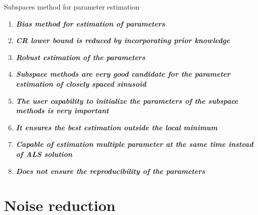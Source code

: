 \documentclass[t,12pt,english
\ifx\beamermode\undefined\else,\beamermode\fi
]{beamer}
\begin{document}
\begin{frame}{Subspaces method for parameter estimation}
 

\begin{block}{\footnotesize{}}\tiny{}
\begin{enumerate} 
\vspace{0.05cm}
      
     \item \tiny{\textbf{\textit{Bias method for estimation of parameters}}} 
     \item \tiny{\textbf{\textit{CR lower bound is reduced by incorporating prior knowledge}}} 
     \item \tiny{\textbf{\textit{Robust estimation of the parameters}}}
     \item \tiny{\textbf{\textit{Subspace methods are very good candidate for the parameter estimation of closely spaced sinusoid}}} 
     \item \tiny{\textbf{\textit{The user capability to initialize the parameters of the subspace methods is very important}}} 
     \item \tiny{\textbf{\textit{It ensures the best estimation outside the local minimum}}} 
     \item \tiny{\textbf{\textit{Capable of estimation multiple parameter at the same time instead of ALS solution}}} 
     \item \tiny{\textbf{\textit{Does not ensure the reproducibility of the parameters}}} 
     
\end{enumerate}
\end{block}
    
\end{frame}


\section{Noise reduction}\label{third-section}
\end{document}
